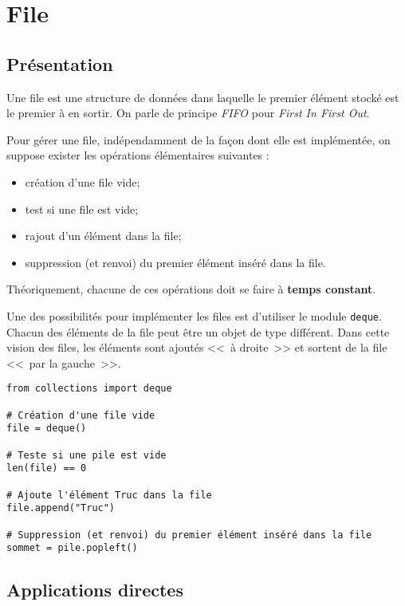 \section{File}
\subsection{Présentation}
\begin{defi}[File]
Une file est une structure de données dans laquelle le premier élément stocké est le premier à en sortir. On parle de principe \textit{FIFO} pour \textit{First In First Out}. 
\end{defi}

Pour gérer une file, indépendamment de la façon dont elle est implémentée, on suppose exister les opérations élémentaires suivantes : 
\begin{itemize}
\item création d'une file vide;
\item test si une file est vide;
\item rajout d'un élément dans la file;
\item suppression (et renvoi) du premier élément inséré dans la file.
\end{itemize}

Théoriquement, chacune de ces opérations doit se faire à \textbf{temps constant}.

Une des possibilités pour implémenter les files est d'utiliser le module \texttt{deque}. Chacun des éléments de la file peut être un objet de type différent. Dans cette vision des files, les éléments sont ajoutés <<~à droite~>> et sortent de la file <<~par la gauche~>>.

\begin{lstlisting} 
from collections import deque

# Création d'une file vide
file = deque() 

# Teste si une pile est vide
len(file) == 0

# Ajoute l'élément Truc dans la file 
file.append("Truc")

# Suppression (et renvoi) du premier élément inséré dans la file
sommet = pile.popleft()

\end{lstlisting}


\subsection{Applications directes}

